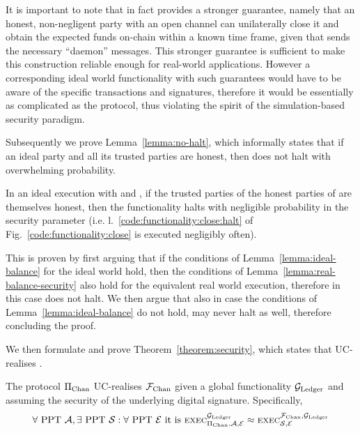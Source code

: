  It is important to note that in fact \pchan provides a stronger guarantee,
  namely that an honest, non-negligent party with an open channel can
  unilaterally close it and obtain the expected funds on-chain within a known
  time frame, given that \environment sends the necessary ``daemon'' messages.
  This stronger guarantee is sufficient to make this construction reliable
  enough for real-world applications. However a corresponding ideal world
  functionality with such guarantees would have to be aware of the specific
  transactions and signatures, therefore it would be essentially as complicated
  as the protocol, thus violating the spirit of the simulation-based security
  paradigm.

  Subsequently we prove Lemma~\ref{lemma:no-halt}, which informally states that
  if an ideal party and all its trusted parties are honest, then \fchan does not
  halt with overwhelming probability.

\begin{lemma}[No halt]
\label{lemma:no-halt}
  In an ideal execution with \fchan and \simulator, if the trusted parties of
  the honest parties of \fchan are themselves honest, then the functionality
  halts with negligible probability in the security parameter (i.e.
  l.~\ref{code:functionality:close:halt} of Fig.~\ref{code:functionality:close}
  is executed negligibly often).
\end{lemma}

  This is proven by first arguing that if
  the conditions of Lemma~\ref{lemma:ideal-balance} for the ideal world hold,
  then the conditions of Lemma~\ref{lemma:real-balance-security} also hold for
  the equivalent real world execution, therefore in this case \fchan does not
  halt. We then argue that also in case the conditions of
  Lemma~\ref{lemma:ideal-balance} do not hold, \fchan may never halt as well,
  therefore concluding the proof.

  We then formulate and prove Theorem~\ref{theorem:security}, which states that
  \pchan UC-realises \fchan.

\begin{theorem}
  \label{theorem:security}
  The protocol $\Pi_{\mathrm{Chan}}$ UC-realises $\mathcal{F}_{\mathrm{Chan}}$ given a global functionality
  $\mathcal{G}_{\mathrm{Ledger}}$ and assuming the security of the underlying digital signature.
  Specifically,
  \begin{gather*}
    \forall \text{ PPT } \mathcal{A}, \exists \text{ PPT } \mathcal{S}: \forall
    \text{ PPT } \mathcal{E} \text{ it is }
    \textsc{exec}^{\mathcal{G}_{\mathrm{Ledger}}}_{\Pi_{\mathrm{Chan}}, \mathcal{A}, \mathcal{E}} \approx
    \textsc{exec}^{\mathcal{F}_{\mathrm{Chan}}, \mathcal{G}_{\mathrm{Ledger}}}_{\mathcal{S}, \mathcal{E}}
  \end{gather*}
\end{theorem}

